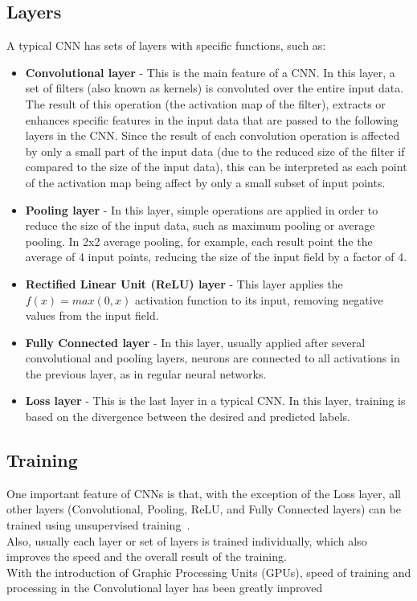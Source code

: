 \subsection{Layers}
\label{sec:convolution:convolutionalneuralnetworks:layers}
A typical CNN has sets of layers with specific functions, such as:
\begin{itemize}
    \item \textbf{Convolutional layer} - This is the main feature of a CNN. In this layer, a set of filters (also known as kernels) is convoluted over the entire input data. The result of this operation (the activation map of the filter), extracts or enhances specific features in the input data that are passed to the following layers in the CNN. Since the result of each convolution operation is affected by only a small part of the input data (due to the reduced size of the filter if compared to the size of the input data), this can be interpreted as each point of the activation map being affect by only a small subset of input points.
    \item \textbf{Pooling layer} - In this layer, simple operations are applied in order to reduce the size of the input data, such as maximum pooling or average pooling. In 2x2 average pooling, for example, each result point the the average of 4 input points, reducing the size of the input field by a factor of 4.
    \item \textbf{Rectified Linear Unit (ReLU) layer} - This layer applies the $f(x) = max(0,x)$ activation function to its input, removing negative values from the input field.
    \item \textbf{Fully Connected layer} - In this layer, usually applied after several convolutional and pooling layers, neurons are connected to all activations in the previous layer, as in regular neural networks.
    \item \textbf{Loss layer} - This is the last layer in a typical CNN. In this layer, training is based on the divergence between the desired and predicted labels.
\end{itemize}
\subsection{Training}
\label{sec:convolution:convolutionalneuralnetworks:training}
One important feature of CNNs is that, with the exception of the Loss layer, all other layers (Convolutional, Pooling, ReLU, and Fully Connected layers) can be trained using unsupervised training~\citep{Arel2010}.\\
Also, usually each layer or set of layers is trained individually, which also improves the speed and the overall result of the training.\\
With the introduction of Graphic Processing Units (GPUs), speed of training and processing in the Convolutional layer has been greatly improved~\citep{Steinkrau2005}
